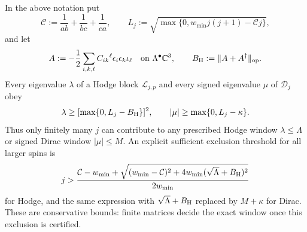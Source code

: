 \documentclass[11pt]{article}
\begin{document}
\begin{proposition}
\label{p1:prop:general-spectral-cutoff-all-operators}
In the above notation put
\[
  \mathcal C:=\frac1{ab}+\frac1{bc}+\frac1{ca},\qquad
  L_j:=\sqrt{\max\{0,w_{\min}j(j+1)-\mathcal Cj\}},
\]
and let
\[
  A:=-\frac12\sum_{i,k,\ell}C_{ik}{}^\ell
        \epsilon_i\epsilon_k\iota_\ell
    \quad\text{on }\Lambda^\bullet\mathbb C^3,
  \qquad B_{\rm H}:=\|A+A^\dagger\|_{\rm op}.
\]
Every eigenvalue $\lambda$ of a Hodge block $\mathscr L_{j,p}$ and every
signed eigenvalue $\mu$ of $\mathscr D_j$ obey
\begin{equation}\label{p1:eq:general-all-operator-cutoffs}
  \lambda\ge[\max\{0,L_j-B_{\rm H}\}]^2,
  \qquad |\mu|\ge\max\{0,L_j-\kappa\}.
\end{equation}
Thus only finitely many $j$ can contribute to any prescribed Hodge
window $\lambda\le\Lambda$ or signed Dirac window $|\mu|\le M$.
An explicit sufficient exclusion threshold for all larger spins is
\[
 j>\frac{\mathcal C-w_{\min}
       +\sqrt{(w_{\min}-\mathcal C)^2
               +4w_{\min}(\sqrt\Lambda+B_{\rm H})^2}}{2w_{\min}}
\]
for Hodge, and the same expression with $\sqrt\Lambda+B_{\rm H}$
replaced by $M+\kappa$ for Dirac.  These are conservative bounds:
finite matrices decide the exact window once this exclusion is certified.
\end{proposition}
\end{document}
